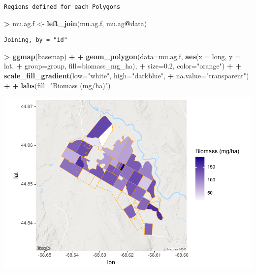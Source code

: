 \documentclass[
]{krantz}
\makeatletter
\newenvironment{Shaded}{\begin{snugshade}}{\end{snugshade}}
\newcommand{\DataTypeTok}[1]{\textcolor[rgb]{0.27,0.27,0.27}{#1}}
\newcommand{\FloatTok}[1]{\textcolor[rgb]{0.06,0.06,0.06}{#1}}
\newcommand{\KeywordTok}[1]{\textcolor[rgb]{0.27,0.27,0.27}{\textbf{#1}}}
\newcommand{\NormalTok}[1]{#1}
\newcommand{\OperatorTok}[1]{\textcolor[rgb]{0.43,0.43,0.43}{\textbf{#1}}}
\newcommand{\StringTok}[1]{\textcolor[rgb]{0.5,0.5,0.5}{#1}}
\newenvironment{kframe}{%
\medskip{}
\setlength{\fboxsep}{.8em}
 \def\at@end@of@kframe{}%
 \ifinner\ifhmode%
  \def\at@end@of@kframe{\end{minipage}}%
  \begin{minipage}{\columnwidth}%
 \fi\fi%
 \def\FrameCommand##1{\hskip\@totalleftmargin \hskip-\fboxsep
 \colorbox{shadecolor}{##1}\hskip-\fboxsep
     \hskip-\linewidth \hskip-\@totalleftmargin \hskip\columnwidth}%
 \MakeFramed {\advance\hsize-\width
   \@totalleftmargin\z@ \linewidth\hsize
   \@setminipage}}%
 {\par\unskip\endMakeFramed%
 \at@end@of@kframe}
\renewenvironment{Shaded}{\begin{kframe}}{\end{kframe}}
\makeatother
\begin{document}
\begin{verbatim}
Regions defined for each Polygons
\end{verbatim}

\begin{Shaded}
\begin{Highlighting}[]
\OperatorTok{\textgreater{}}\StringTok{ }\NormalTok{mu.ag.f \textless{}{-}}\StringTok{ }\KeywordTok{left\_join}\NormalTok{(mu.ag.f, mu.ag}\OperatorTok{@}\NormalTok{data)}
\end{Highlighting}
\end{Shaded}

\begin{verbatim}
Joining, by = "id"
\end{verbatim}

\begin{Shaded}
\begin{Highlighting}[]
\OperatorTok{\textgreater{}}\StringTok{ }\KeywordTok{ggmap}\NormalTok{(basemap) }\OperatorTok{+}
\OperatorTok{+}\StringTok{     }\KeywordTok{geom\_polygon}\NormalTok{(}\DataTypeTok{data=}\NormalTok{mu.ag.f, }\KeywordTok{aes}\NormalTok{(}\DataTypeTok{x =}\NormalTok{ long, }\DataTypeTok{y =}\NormalTok{ lat, }
\OperatorTok{+}\StringTok{                                 }\DataTypeTok{group=}\NormalTok{group, }\DataTypeTok{fill=}\NormalTok{biomass\_mg\_ha), }
\OperatorTok{+}\StringTok{                  }\DataTypeTok{size=}\FloatTok{0.2}\NormalTok{, }\DataTypeTok{color=}\StringTok{"orange"}\NormalTok{) }\OperatorTok{+}
\OperatorTok{+}\StringTok{     }\KeywordTok{scale\_fill\_gradient}\NormalTok{(}\DataTypeTok{low=}\StringTok{"white"}\NormalTok{, }\DataTypeTok{high=}\StringTok{"darkblue"}\NormalTok{, }
\OperatorTok{+}\StringTok{                         }\DataTypeTok{na.value=}\StringTok{"transparent"}\NormalTok{) }\OperatorTok{+}
\OperatorTok{+}\StringTok{     }\KeywordTok{labs}\NormalTok{(}\DataTypeTok{fill=}\StringTok{"Biomass (mg/ha)"}\NormalTok{)}
\end{Highlighting}
\end{Shaded}

\includegraphics{bookdown_files/figure-latex/unnamed-chunk-222-1.pdf}
\end{document}
